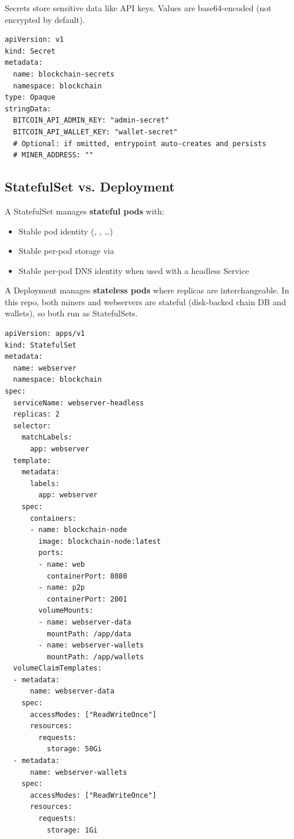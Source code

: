 Secrets store sensitive data like API keys. Values are base64-encoded (not encrypted by default).

\begin{listing}[htbp]
\caption{Secret for API Keys}
\label{lst:ch23-secret}
\begin{verbatim}
apiVersion: v1
kind: Secret
metadata:
  name: blockchain-secrets
  namespace: blockchain
type: Opaque
stringData:
  BITCOIN_API_ADMIN_KEY: "admin-secret"
  BITCOIN_API_WALLET_KEY: "wallet-secret"
  # Optional: if omitted, entrypoint auto-creates and persists
  # MINER_ADDRESS: ""
\end{verbatim}
\end{listing}

\subsection{StatefulSet vs. Deployment}

A StatefulSet manages \textbf{stateful pods} with:
\begin{itemize}
  \item Stable pod identity (, , \ldots)
  \item Stable per-pod storage via 
  \item Stable per-pod DNS identity when used with a headless Service
\end{itemize}

A Deployment manages \textbf{stateless pods} where replicas are interchangeable. In this repo, both miners and webservers are stateful (disk-backed chain DB and wallets), so both run as StatefulSets.

\begin{listing}[htbp]
\caption{StatefulSet for Webservers}
\label{lst:ch23-statefulset}
\begin{verbatim}
apiVersion: apps/v1
kind: StatefulSet
metadata:
  name: webserver
  namespace: blockchain
spec:
  serviceName: webserver-headless
  replicas: 2
  selector:
    matchLabels:
      app: webserver
  template:
    metadata:
      labels:
        app: webserver
    spec:
      containers:
      - name: blockchain-node
        image: blockchain-node:latest
        ports:
        - name: web
          containerPort: 8080
        - name: p2p
          containerPort: 2001
        volumeMounts:
        - name: webserver-data
          mountPath: /app/data
        - name: webserver-wallets
          mountPath: /app/wallets
  volumeClaimTemplates:
  - metadata:
      name: webserver-data
    spec:
      accessModes: ["ReadWriteOnce"]
      resources:
        requests:
          storage: 50Gi
  - metadata:
      name: webserver-wallets
    spec:
      accessModes: ["ReadWriteOnce"]
      resources:
        requests:
          storage: 1Gi
\end{verbatim}
\end{listing}

